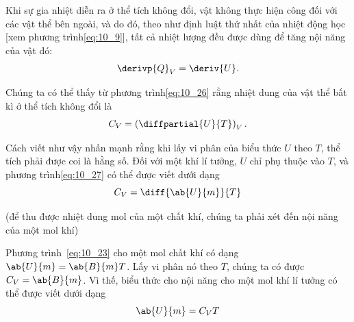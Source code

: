 Khi sự gia nhiệt diễn ra ở thể tích không đổi, vật không thực hiện công đối với các vật thể bên ngoài, và do đó, theo như định luật thứ nhất của nhiệt động học [xem phương trình\eqref{eq:10_9}], tất cả nhiệt lượng đều được dùng để tăng nội năng của vật đó:  
\begin{equation}\label{eq:10_26}
	\derivp{Q}_V = \deriv{U}.
\end{equation}

\noindent

Chúng ta có thể thấy từ phương trình\eqref{eq:10_26} rằng nhiệt dung của vật thể bất kì ở thể tích không đổi là
\begin{equation}\label{eq:10_27}
	C_V = \left(\diffpartial{U}{T}\right)_V.
\end{equation}

\noindent

Cách viết như vậy nhấn mạnh rằng khi lấy vi phân của biểu thức $U$ theo $T$, thể tích phải được coi là hằng số. Đối với một khí lí tưởng, $U$ chỉ phụ thuộc vào $T$, và phương trình\eqref{eq:10_27} có thể được viết dưới dạng
\begin{equation*}
	C_V = \diff{\ab{U}{m}}{T}
\end{equation*}

\noindent

(để thu được nhiệt dung mol của một chất khí, chúng ta phải xét đến nội năng của một mol khí) 


Phương trình~\eqref{eq:10_23} cho một mol chất khí có dạng $\ab{U}{m}=\ab{B}{m}T$. Lấy vi phân nó theo $T$, chúng ta có được $C_V=\ab{B}{m}$. Vì thế, biểu thức cho nội năng cho một mol khí lí tưởng có thể được viết dưới dạng 
\begin{equation}\label{eq:10_28}
	\ab{U}{m} = C_V T
\end{equation}

\noindent


